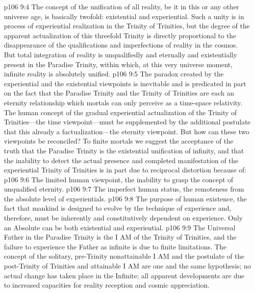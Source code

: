 \vs p106 9:4 The concept of the unification of all reality, be it in this or any other universe age, is basically twofold: existential and experiential. Such a unity is in process of experiential realization in the Trinity of Trinities, but the degree of the apparent actualization of this threefold Trinity is directly proportional to the disappearance of the qualifications and imperfections of reality in the cosmos. But total integration of reality is unqualifiedly and eternally and existentially present in the Paradise Trinity, within which, at this very universe moment, infinite reality is absolutely unified.
\pc \vs p106 9:5 The paradox created by the experiential and the existential viewpoints is inevitable and is predicated in part on the fact that the Paradise Trinity and the Trinity of Trinities are each an eternity relationship which mortals can only perceive as a time\hyp{}space relativity. The human concept of the gradual experiential actualization of the Trinity of Trinities---the time viewpoint---must be supplemented by the additional postulate that this  already a factualization---the eternity viewpoint. But how can these two viewpoints be reconciled? To finite mortals we suggest the acceptance of the truth that the Paradise Trinity is the existential unification of infinity, and that the inability to detect the actual presence and completed manifestation of the experiential Trinity of Trinities is in part due to reciprocal distortion because of:
\pc \vs p106 9:6 \bibnobreakspace The limited human viewpoint, the inability to grasp the concept of unqualified eternity.
\vs p106 9:7 \bibnobreakspace The imperfect human status, the remoteness from the absolute level of experientials.
\vs p106 9:8 \bibnobreakspace The purpose of human existence, the fact that mankind is designed to evolve by the technique of experience and, therefore, must be inherently and constitutively dependent on experience. Only an Absolute can be both existential and experiential.
\pc \vs p106 9:9 The Universal Father in the Paradise Trinity is the I AM of the Trinity of Trinities, and the failure to experience the Father as infinite is due to finite limitations. The concept of the  solitary, pre\hyp{}Trinity nonattainable I AM and the postulate of the  post\hyp{}Trinity of Trinities and attainable I AM are one and the same hypothesis; no actual change has taken place in the Infinite; all apparent developments are due to increased capacities for reality reception and cosmic appreciation.
